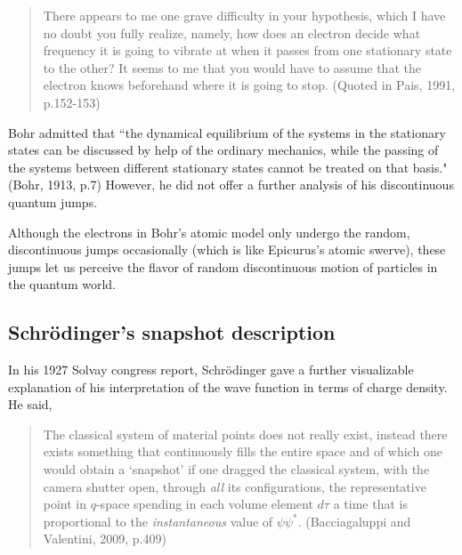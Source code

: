  \begin{quote}  
There appears to me one grave difficulty in your hypothesis, which I have no doubt you fully realize, namely, how does an electron decide what frequency it is going to vibrate at when it passes from one stationary state to the other? It seems to me that you would have to assume that the electron knows beforehand where it is going to stop. (Quoted in Pais, 1991, p.152-153)
 \end{quote}

Bohr admitted that ``the dynamical equilibrium of the systems in the stationary states can be discussed by help of the ordinary mechanics, while the passing of the systems between different stationary states cannot be treated on that basis." (Bohr, 1913, p.7) However, he did not offer a further analysis of his discontinuous quantum jumps.

Although the electrons in Bohr's atomic model only undergo the random, discontinuous jumps occasionally (which is like Epicurus's atomic swerve), these jumps let us perceive the flavor of random discontinuous motion of particles in the quantum world.

\subsection{Schr\"{o}dinger's snapshot description}

In his 1927 Solvay congress report, Schr\"{o}dinger gave a further visualizable explanation of his interpretation of the wave function in terms of charge density. He said, 


 \begin{quote}  
The classical system of material points does not really exist, instead there exists something that continuously 
fills the entire space and of which one would obtain a `snapshot' if one dragged the classical system, with the camera shutter open,  through {\em all} its configurations, the representative point in $q$-space spending in each volume element $d\tau$ a time that is proportional to the {\em instantaneous} value of $\psi\psi^*$.  (Bacciagaluppi and Valentini, 2009, p.409)
 \end{quote} 

